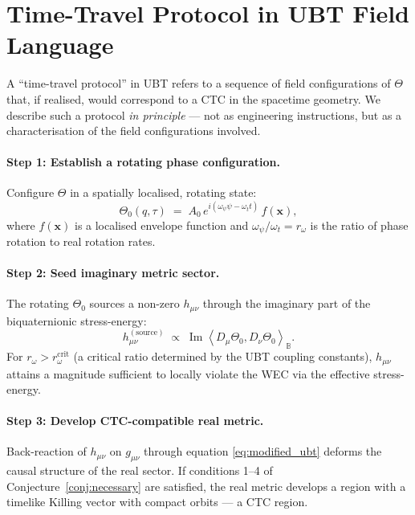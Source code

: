 \documentclass[12pt]{article}
\begin{document}
\section{Time-Travel Protocol in UBT Field Language}
A ``time-travel protocol'' in UBT refers to a sequence of field
configurations of $\Theta$ that, if realised, would correspond to a
CTC in the spacetime geometry.  We describe such a protocol
\emph{in principle} — not as engineering instructions, but as a
characterisation of the field configurations involved.

\paragraph{Step 1: Establish a rotating phase configuration.}
Configure $\Theta$ in a spatially localised, rotating state:
\begin{equation}
  \Theta_0(q,\tau) \;=\; A_0\,e^{i(\omega_\psi\psi - \omega_t t)}\,
  f(\mathbf{x}),
\end{equation}
where $f(\mathbf{x})$ is a localised envelope function and
$\omega_\psi/\omega_t = r_\omega$ is the ratio of phase rotation to real
rotation rates.

\paragraph{Step 2: Seed imaginary metric sector.}
The rotating $\Theta_0$ sources a non-zero $h_{\mu\nu}$ through the
imaginary part of the biquaternionic stress-energy:
\begin{equation}
  h_{\mu\nu}^{(\mathrm{source})} \;\propto\;
  \operatorname{Im}\!\left\langle D_\mu\Theta_0, D_\nu\Theta_0
  \right\rangle_\mathbb{B}.
\end{equation}
For $r_\omega > r_\omega^{\mathrm{crit}}$ (a critical ratio determined by
the UBT coupling constants), $h_{\mu\nu}$ attains a magnitude sufficient
to locally violate the WEC via the effective stress-energy.

\paragraph{Step 3: Develop CTC-compatible real metric.}
Back-reaction of $h_{\mu\nu}$ on $g_{\mu\nu}$ through equation
\eqref{eq:modified_ubt} deforms the causal structure of the real sector.
If conditions 1--4 of Conjecture~\ref{conj:necessary} are satisfied, the
real metric develops a region with a timelike Killing vector with compact
orbits — a CTC region.
\end{document}
